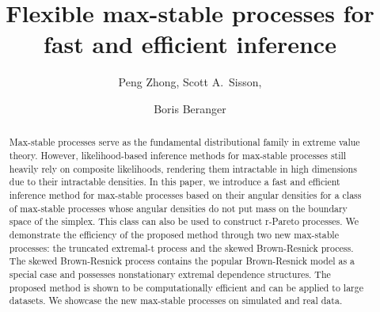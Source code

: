 \documentclass[lineno]{biometrika}
\begin{document}



\title{Flexible max-stable processes for fast and efficient inference}

\author{Peng Zhong, Scott A.~Sisson, \and Boris Beranger}



\maketitle

\begin{abstract}
    Max-stable processes serve as the fundamental distributional family in extreme value theory. However, likelihood-based inference methods for max-stable processes still heavily rely on composite likelihoods, rendering them intractable in high dimensions due to their intractable densities. In this paper, we introduce a fast and efficient inference method for max-stable processes based on their angular densities for a class of max-stable processes whose angular densities do not put mass on the boundary space of the simplex. This class can also be used to construct r-Pareto processes. We demonstrate the efficiency of the proposed method through two new max-stable processes: the truncated extremal-t process and the skewed Brown-Resnick process.  The skewed Brown-Resnick process contains the popular Brown-Resnick model as a special case and possesses nonstationary extremal dependence structures. The proposed method is shown to be computationally efficient and can be applied to large datasets. We showcase the new max-stable processes on simulated and real data. 
\end{abstract}
\end{document}
